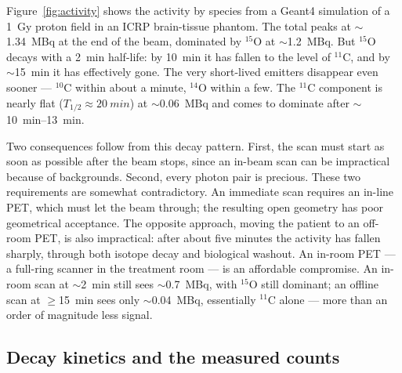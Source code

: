 \documentclass[11pt]{article}
\newcommand{\Cl}[1]{{}^{#1}\mathrm{C}}
\newcommand{\Ox}[1]{{}^{#1}\mathrm{O}}
\begin{document}
Figure~\ref{fig:activity} shows the activity by species from a Geant4 simulation of
a \SI{1}{Gy} proton field in an ICRP brain-tissue phantom.
The total peaks at $\sim$\SI{1.34}{MBq} at the end of the beam, dominated by
$\Ox{15}$ at $\sim$\SI{1.2}{MBq}. But $\Ox{15}$ decays with a \SI{2}{min} half-life:
by \SI{10}{min} it has fallen to the level of $\Cl{11}$, and by $\sim$\SI{15}{min}
it has effectively gone. The very short-lived emitters disappear even sooner ---
$\Cl{10}$ within about a minute, $\Ox{14}$ within a few. The $\Cl{11}$ component is
nearly flat ($T_{1/2}\approx\SI{20}{min}$) at $\sim$\SI{0.06}{MBq} and comes to
dominate after $\sim$\SIrange{10}{13}{min}.

Two consequences follow from this decay pattern. First, the scan must start as soon as possible after the beam stops, since an in-beam scan can be impractical because of backgrounds. Second, every photon pair is precious. These two requirements are somewhat contradictory. An immediate scan requires an in-line PET, which must let the beam through; the resulting open geometry has poor geometrical acceptance. The opposite approach, moving the patient to an off-room PET, is also impractical: after about five minutes the activity has fallen sharply, through both isotope decay and biological washout. An in-room PET --- a full-ring scanner in the treatment room --- is an affordable compromise. An in-room scan at $\sim$\SI{2}{min} still sees $\sim$\SI{0.7}{MBq}, with $\Ox{15}$ still dominant; an offline scan at $\geq$\SI{15}{min} sees only $\sim$\SI{0.04}{MBq}, essentially $\Cl{11}$ alone --- more than an order of magnitude less signal.

\subsection{Decay kinetics and the measured counts}
\label{sec:kinetics}
\end{document}
